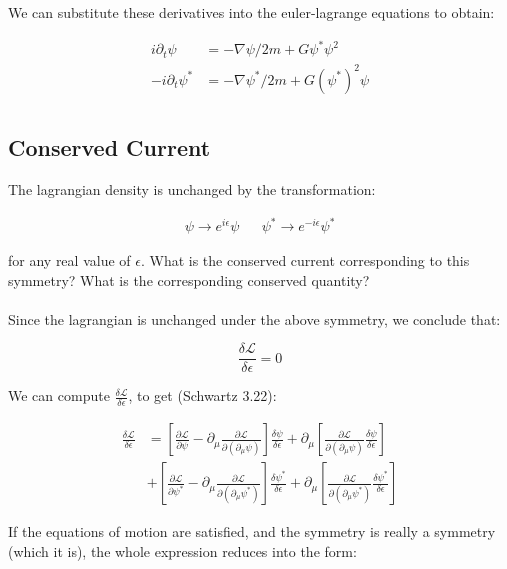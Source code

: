 \documentclass{article}
\newcommand{\Lagr}[0]{\mathcal{L}}
\begin{document}
We can substitute these derivatives into the euler-lagrange equations to obtain:

\begin{align*}
i \partial_t \psi & = - \nabla \psi / 2 m + G \psi^* \psi^2 \\
- i \partial_t \psi^* & = - \nabla \psi^* / 2 m + G (\psi^*)^2 \psi \\
\end{align*}

\subsection{Conserved Current}

The lagrangian density is unchanged by the transformation:

\begin{align*}
\psi \to e^{i \epsilon} \psi & & \psi^* \to e^{- i \epsilon} \psi^* 
\end{align*}

for any real value of $\epsilon$.
What is the conserved current corresponding to this symmetry?
What is the corresponding conserved quantity?

\paragraph{}
Since the lagrangian is unchanged under the above symmetry, we conclude that:

\[ \frac{\delta \Lagr}{\delta \epsilon} = 0 \]

We can compute $\frac{\delta \Lagr}{\delta \epsilon}$, to get (Schwartz 3.22):

\begin{align*}
 \frac{\delta \Lagr}{\delta \epsilon} 
	 & = \left[ \frac{\partial \Lagr}{\partial \psi} - \partial_\mu
		\frac{\partial \Lagr}{\partial(\partial_\mu \psi)} \right]
	\frac{\delta \psi}{\delta \epsilon}
	+ \partial_\mu \left[ \frac{\partial \Lagr}{\partial( \partial_\mu \psi)}
	\frac{\delta \psi}{\delta \epsilon} \right]\\
& + \left[ \frac{\partial \Lagr}{\partial \psi^*} - \partial_\mu
		\frac{\partial \Lagr}{\partial(\partial_\mu \psi^*)} \right]
	\frac{\delta \psi^*}{\delta \epsilon}
	+ \partial_\mu \left[ \frac{\partial \Lagr}{\partial( \partial_\mu \psi^*)}
	\frac{\delta \psi^*}{\delta \epsilon} \right]
\end{align*}

If the equations of motion are satisfied, and the symmetry is really a symmetry (which it is),
	the whole expression reduces into the form:
\end{document}
